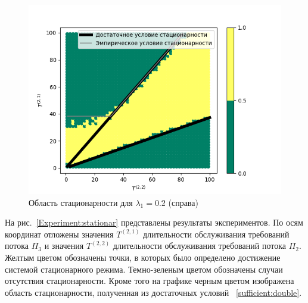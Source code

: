 \documentclass[11pt]{ubs}
\begin{document}
\begin{figure}[ht]
    \includegraphics[scale=0.7]{0_2_thres_10_fact.png} 
\caption{Область стационарности для $\lambda_1 = 0.2$ (справа)}
\label{Experiment:intensities:two}
\end{figure}


На рис.~\ref{Experiment:stationar} представлены результаты экспериментов. По осям координат отложены значения $T^{(2,1)}$ длительности обслуживания требований потока $\Pi_3$ и значения $T^{(2,2)}$ длительности обслуживания требований потока $\Pi_2$. Желтым цветом обозначены точки, в которых было определено достижение системой стационарного режима. Темно-зеленым цветом обозначены случаи отсутствия стационарности. Кроме того на графике черным цветом изображена область стационарности, полученная из достаточных условий ~\ref{sufficient:double}. 
\end{document}
